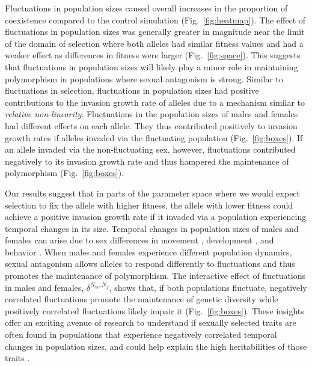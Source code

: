 \documentclass[12pt]{article}
\begin{document}
 Fluctuations in population sizes caused overall increases in the proportion of coexistence compared to the control simulation  (Fig.~\ref{fig:heatmap}).  The effect of fluctuations in population sizes was generally greater in magnitude near the limit of the domain of selection where both alleles had similar fitness values and had a weaker effect as differences in fitness were larger (Fig.~\ref{fig:space}). This suggests that fluctuations in population sizes will likely play a minor role in maintaining polymorphism in populations where sexual antagonism is strong.  Similar to fluctuations in selection, fluctuations in population sizes had positive contributions to the invasion growth rate of alleles due to a mechanism similar to \textit{relative non-linearity}. Fluctuations in the population sizes of males and females had different effects on each allele. They thus contributed positively to invasion growth rates if alleles invaded via the fluctuating population (Fig.~\ref{fig:boxes}). If an allele invaded via the non-fluctuating sex, however, fluctuations contributed negatively to its invasion growth rate and thus hampered the maintenance of polymorphism (Fig.~\ref{fig:boxes}).

 Our results suggest that in parts of the parameter space where we would expect selection to fix the allele with higher fitness, the allele with lower fitness could achieve a positive invasion growth rate if it invaded via a population experiencing temporal changes in its size.  Temporal changes in population sizes of males and females can arise due to sex differences in movement \citep[e.g., if males immigrate to higher quality areas;][]{matter2002experimental}, development \citep[e.g., females requiring more time to mature than males;][]{kasumovic2008spatial}, and behavior \citep[e.g., cannibalistic mating;][]{elgar2003male}. When males and females experience different population dynamics, sexual antagonism allows alleles to respond differently to fluctuations and thus promotes the maintenance of polymorphism. The interactive effect of fluctuations in males and females, $\delta^{N_{m},N_{f}}$, shows that, if both populations fluctuate, negatively correlated fluctuations promote the maintenance of genetic diversity while positively correlated fluctuations likely impair it  (Fig.~\ref{fig:boxes}). These insights offer an exciting avenue of research to understand if sexually selected traits are often found in populations that experience negatively correlated temporal changes in population sizes, and could help explain the high heritabilities of those traits \citep{reinhold2000maintenance}.
\end{document}
